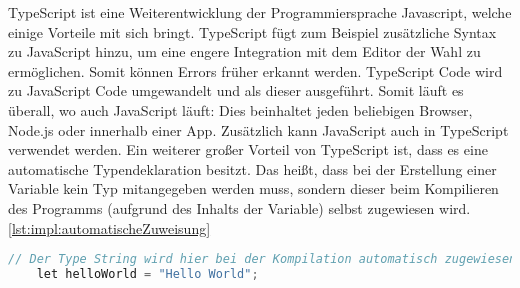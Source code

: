 TypeScript ist eine Weiterentwicklung der Programmiersprache Javascript, welche einige Vorteile mit sich bringt. TypeScript fügt zum Beispiel zusätzliche Syntax zu JavaScript hinzu, um eine engere Integration mit dem Editor der Wahl zu ermöglichen. Somit können Errors früher erkannt werden. TypeScript Code wird zu JavaScript Code umgewandelt und als dieser ausgeführt. Somit läuft es überall, wo auch JavaScript läuft: Dies beinhaltet jeden beliebigen Browser, Node.js oder innerhalb einer App. Zusätzlich kann JavaScript auch in TypeScript verwendet werden. Ein weiterer großer Vorteil von TypeScript ist, dass es eine automatische Typendeklaration besitzt. Das heißt, dass bei der Erstellung einer Variable kein Typ mitangegeben werden muss, sondern dieser beim Kompilieren des Programms (aufgrund des Inhalts der Variable) selbst zugewiesen wird. \ref{lst:impl:automatischeZuweisung}
\cite{JavaScriptJavaEntwickler} 
\cite{TypeScriptOverview} 

\begin{lstlisting}[language=java,caption=TypeScript automatische Zuweisung,label=lst:impl:automatischeZuweisung]
    // Der Type String wird hier bei der Kompilation automatisch zugewiesen
    let helloWorld = "Hello World";
\end{lstlisting}